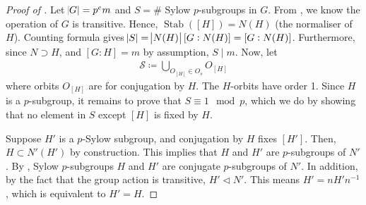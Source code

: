 \documentclass[11pt]{amsart} %
\theoremstyle{definition}
\theoremstyle{definition}
\DeclareMathOperator{\stab}{Stab}
\numberwithin{equation}{section}
\begin{document}
\begin{proof}[Proof of ]
	Let $\abs{G} = p^e m$ and $S = \# $ Sylow $p$-subgroups in $G$. From , we know the operation of $G$ is transitive. Hence, $\stab([H]) = N(H)$ (the normaliser of $H$). Counting formula gives $\abs{S} = \abs{N(H)} [G:N(H)] = [G:N(H)]$. Furthermore, since $N \supset H$, and $[G:H] = m$ by assumption, $S \mid m$. Now, let 
	\begin{align*}
		\mathscr{S} \coloneqq \bigcup_{O_{[H]} \in O_{s}} O_{[H]}
	\end{align*}
	where orbits $O_{[H]}$ are for conjugation by $H$. The $H$-orbits have order 1. Since $H$ is a $p$-subgroup, it remains to prove that $S \equiv 1 \mod p$, which we do by showing that no element in $S$ except $[H]$ is fixed by $H$.
	
	Suppose $H' $ is a $p$-Sylow subgroup, and conjugation by $H$ fixes $[H']$. Then, $H \subset N'(H')$ by construction. This implies that $H$ and $H'$ are $p$-subgroups of $N'$. By , Sylow $p$-subgroups $H$ and $H'$ are conjugate $p$-subgroups of $N'$. In addition, by the fact that the group action is transitive, $H' \lhd N'$. This means $H' = n H' n^{-1}$, which is equivalent to $H' = H$.
\end{proof}
\end{document}
